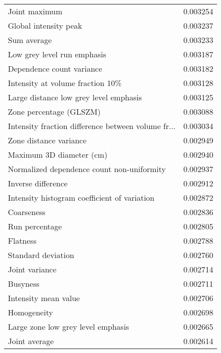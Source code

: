 \begin{longtable}{|lr|}
Joint maximum                                      &        0.003254 \\
Global intensity peak                              &        0.003237 \\
Sum average                                        &        0.003233 \\
Low grey level run emphasis                        &        0.003187 \\
Dependence count variance                          &        0.003182 \\
Intensity at volume fraction 10\%                   &        0.003128 \\
Large distance low grey level emphasis             &        0.003125 \\
Zone percentage (GLSZM)                            &        0.003088 \\
Intensity fraction difference between volume fr... &        0.003034 \\
Zone distance variance                             &        0.002949 \\
Maximum 3D diameter (cm)                           &        0.002940 \\
Normalized dependence count non-uniformity         &        0.002937 \\
Inverse difference                                 &        0.002912 \\
Intensity histogram coefficient of variation       &        0.002872 \\
Coarseness                                         &        0.002836 \\
Run percentage                                     &        0.002805 \\
Flatness                                           &        0.002788 \\
Standard deviation                                 &        0.002760 \\
Joint variance                                     &        0.002714 \\
Busyness                                           &        0.002711 \\
Intensity mean value                               &        0.002706 \\
Homogeneity                                        &        0.002698 \\
Large zone low grey level emphasis                 &        0.002665 \\
Joint average                                      &        0.002614 \\

\end{longtable}
